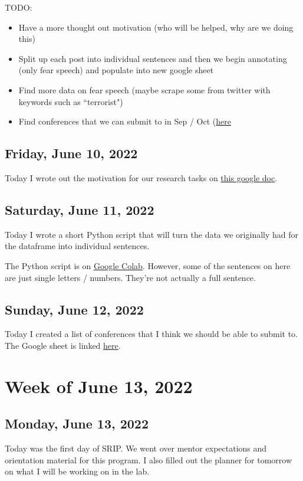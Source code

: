 \documentclass[11pt,letterpaper]{article}
\begin{document}
TODO:
\begin{itemize}
    \item Have a more thought out motivation (who will be helped, why are we doing this)
    \item Split up each post into individual sentences and then we begin annotating (only fear speech) and populate into new google sheet
    \item Find more data on fear speech (maybe scrape some from twitter with keywords such as ``terrorist")
    \item Find conferences that we can submit to in Sep / Oct (\href{https://www.junglelightspeed.com/the-top-10-nlp-conferences/}{here}
\end{itemize}

\subsection{Friday, June 10, 2022}
Today I wrote out the motivation for our research tasks on \href{https://docs.google.com/document/d/17kLWPe7UvaFoTWG4jR4-Zsl5Ngrt6Gf5Pqt5q5fmRsw/edit}{this google doc}.

\subsection{Saturday, June 11, 2022}
Today I wrote a short Python script that will turn the data we originally had for the dataframe into individual sentences.

The Python script is on \href{https://colab.research.google.com/drive/1SiPwRhosjSFBRKsibU_2UrM60fwUtp9I?usp=sharing}{Google Colab}. However, some of the sentences on here are just single letters / numbers. They're not actually a full sentence.

\subsection{Sunday, June 12, 2022}
Today I created a list of conferences that I think we should be able to submit to. The Google sheet is linked \href{https://docs.google.com/spreadsheets/d/1xaAznWx4lQz2tLoyNnGAnjFkoCbv78nOoP6YjoFKf5Y/edit#gid=0}{here}.

\section{Week of June 13, 2022}
\subsection{Monday, June 13, 2022}
Today was the first day of SRIP. We went over mentor expectations and orientation material for this program. I also filled out the planner for tomorrow on what I will be working on in the lab.
\end{document}

